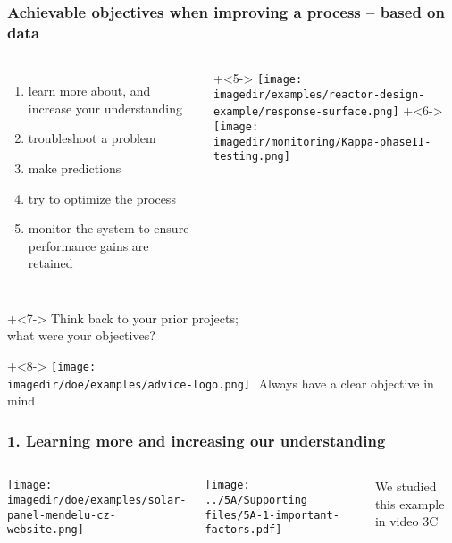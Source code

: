 \begin{frame}\frametitle{Achievable objectives when improving a process -- based on data}
	\pause
	\begin{columns}[t]
			\begin{enumerate}
				\item	learn more about, and increase your understanding  \pause
				\item	troubleshoot a problem  \pause
				\item	make predictions  \pause
				\item	try to optimize the process  \pause
				\item	monitor the system to ensure performance gains are retained  \pause
			\end{enumerate}
	
			\onslide+<5->{
				\texttt{[image: \\imagedir/examples/reactor-design-example/response-surface.png]}
			}
			\onslide+<6->{
				\texttt{[image: \\imagedir/monitoring/Kappa-phaseII-testing.png]}
			}
			
	\end{columns}
	
	\vspace{-1cm}
	\onslide+<7->{
		Think back to your prior projects; \\what were your objectives?
	}

	\vspace{1cm}
	\onslide+<8->{
		\hfill \texttt{[image: \\imagedir/doe/examples/advice-logo.png]}
		\,\,{\color{blue}Always have a clear objective in mind}
	}
\end{frame}

\begin{frame}\frametitle{1. Learning more and increasing our understanding}
	\begin{columns}[T]
			\texttt{[image: \\imagedir/doe/examples/solar-panel-mendelu-cz-website.png]}
			
			
			
			\texttt{[image: ../5A/Supporting files/5A-1-important-factors.pdf]}
		
			\vspace{.5cm}
			\color{myOrange}\tiny We studied this example in video 3C
			
	\end{columns}
\end{frame}

